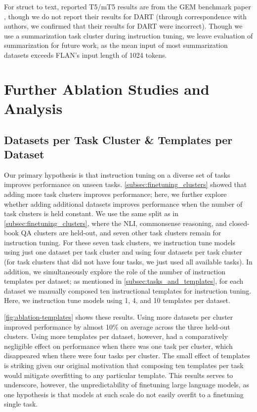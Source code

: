 \documentclass{article} %
\newcommand{\flan}{FLAN}
\begin{document}
For struct to text, reported T5/mT5 results are from the GEM benchmark paper \citep{gehrmann2021gem}, though we do not report their results for DART (through correspondence with authors, we confirmed that their results for DART were incorrect). 
Though we use a summarization task cluster during instruction tuning, we leave evaluation of summarization for future work, as the mean input of most summarization datasets exceeds \flan's input length of 1024 tokens.






\clearpage
\section{Further Ablation Studies and Analysis}
\subsection{Datasets per Task Cluster \& Templates per Dataset}
Our primary hypothesis is that instruction tuning on a diverse set of tasks improves performance on unseen tasks.
\cref{subsec:finetuning_clusters} showed that adding more task clusters improves performance; here, we further explore whether adding additional datasets improves performance when the number of task clusters is held constant.
We use the same split as in \cref{subsec:finetuning_clusters}, where the NLI, commonsense reasoning, and closed-book QA clusters are held-out, and seven other task clusters remain for instruction tuning.
For these seven task clusters, we instruction tune models using just one dataset per task cluster and using four datasets per task cluster (for task clusters that did not have four tasks, we just used all available tasks). 
In addition, we simultaneously explore the role of the number of instruction templates per dataset; as mentioned in \cref{subsec:tasks_and_templates}, for each dataset we manually composed ten instructional templates for instruction tuning. 
Here, we instruction tune models using 1, 4, and 10 templates per dataset.

\cref{fig:ablation-templates} shows these results.
Using more datasets per cluster improved performance by almost 10\% on average across the three held-out clusters. 
Using more templates per dataset, however, had a comparatively negligible effect on performance when there was one task per cluster, which disappeared when there were four tasks per cluster.
The small effect of templates is striking given our original motivation that composing ten templates per task would mitigate overfitting to any particular template. 
This results serves to underscore, however, the unpredictability of finetuning large language models, as one hypothesis is that models at such scale do not easily overfit to a finetuning single task.
\end{document}
